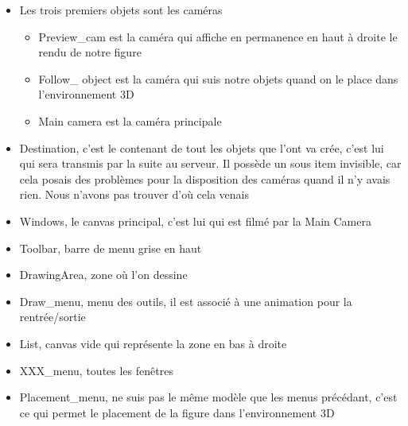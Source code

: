\documentclass[a4paper,11pt]{article}
\begin{document}
		\begin{itemize}
			\item Les trois premiers objets sont les caméras
				\begin{itemize}
					\item Preview\_cam est la caméra qui affiche en permanence en haut à droite le rendu de notre figure
					\item Follow\_ object est la caméra qui suis notre objets quand on le place dans l'environnement 3D
					\item Main camera est la caméra principale
				\end{itemize}
			\item Destination, c'est le contenant de tout les objets que l'ont va crée, c'est lui qui sera transmis par la suite au serveur. Il possède un sous item invisible, car cela posais des problèmes pour la disposition des caméras quand il n'y avais rien. Nous n'avons pas trouver d'où cela venais
			\item Windows, le canvas principal, c'est lui qui est filmé par la Main Camera
			\item Toolbar, barre de menu grise en haut
			\item DrawingArea, zone où l'on dessine
			\item Draw\_menu, menu des outils, il est associé à une animation pour la rentrée/sortie
			\item List, canvas vide qui représente la zone en bas à droite
			\item XXX\_menu, toutes les fenêtres
			\item Placement\_menu, ne suis pas le même modèle que les menus précédant, c'est ce qui permet le placement de la figure dans l'environnement 3D
		\end{itemize}
\end{document}
